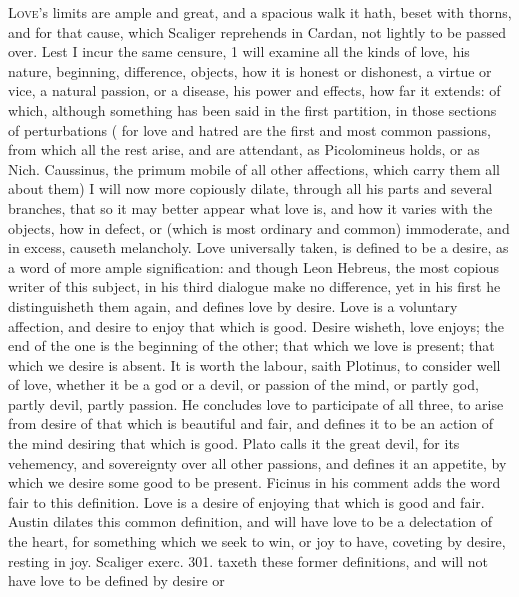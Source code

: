 {\lettrine{L}{ove}'s limits are ample and great, and a spacious walk it hath, beset
with thorns, and for that cause, which Scaliger reprehends in
Cardan, not lightly to be passed over. Lest I incur the same censure, 1
will examine all the kinds of love, his nature, beginning, difference,
objects, how it is honest or dishonest, a virtue or vice, a natural
passion, or a disease, his power and effects, how far it extends: of
which, although something has been said in the first partition, in
those sections of perturbations ( for love and hatred are the
first and most common passions, from which all the rest arise, and are
attendant, as Picolomineus holds, or as Nich. Caussinus, the primum
mobile of all other affections, which carry them all about them) I will
now more copiously dilate, through all his parts and several branches,
that so it may better appear what love is, and how it varies with the
objects, how in defect, or (which is most ordinary and common)
immoderate, and in excess, causeth melancholy.
Love universally taken, is defined to be a desire, as a word of more
ample signification: and though Leon Hebreus, the most copious writer
of this subject, in his third dialogue make no difference, yet in his
first he distinguisheth them again, and defines love by desire.
Love is a voluntary affection, and desire to enjoy that which is
good. Desire wisheth, love enjoys; the end of the one is the
beginning of the other; that which we love is present; that which we
desire is absent. It is worth the labour, saith Plotinus, to
consider well of love, whether it be a god or a devil, or passion of
the mind, or partly god, partly devil, partly passion. He concludes
love to participate of all three, to arise from desire of that which is
beautiful and fair, and defines it to be an action of the mind desiring
that which is good. Plato calls it the great devil, for its
vehemency, and sovereignty over all other passions, and defines it an
appetite, by which we desire some good to be present. Ficinus in
his comment adds the word fair to this definition. Love is a desire of
enjoying that which is good and fair. Austin dilates this common
definition, and will have love to be a delectation of the heart,
for something which we seek to win, or joy to have, coveting by
desire, resting in joy. Scaliger exerc. 301. taxeth these former
definitions, and will not have love to be defined by desire or
}
